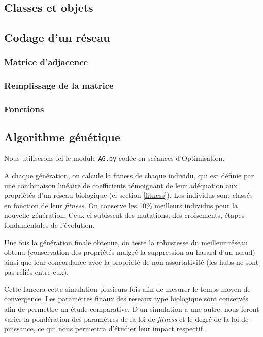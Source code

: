 \subsection{Classes et objets}

\subsection{Codage d'un réseau}
\subsubsection{Matrice d'adjacence}
\subsubsection{Remplissage de la matrice}
\subsubsection{Fonctions}

\subsection{Algorithme génétique}
Nous utiliserons ici le module \texttt{AG.py} codée en scéances d'Optimisation. 

A chaque génération, on calcule la fitness de chaque individu, qui est définie par une combinaison linéaire de coefficients témoignant de leur adéquation aux propriétés d'un réseau biologique (cf section \ref{fitness}).
Les individus sont classés en fonction de leur \textit{fitness}. On conserve les 10\% meilleurs individus pour la nouvelle génération. Ceux-ci subissent des mutations, des croisements, étapes fondamentales de l'évolution.

Une fois la génération finale obtenue, on teste la robustesse du meilleur réseau obtenu (conservation des propriétés malgré la suppression au hasard d'un nœud) ainsi que leur concordance avec la propriété de non-assortativité (les hubs ne sont pas reliés entre eux).

Cette lancera cette simulation plusieurs fois afin de mesurer le temps moyen de convergence.
Les paramètres finaux des réseaux type \og biologique \fg sont conservés afin de permettre un étude comparative. D'un simulation à une autre, nous feront varier la pondération des paramètres de la loi de \textit{fitness} et le degré de la loi de puissance, ce qui nous permettra d'étudier leur impact respectif.


